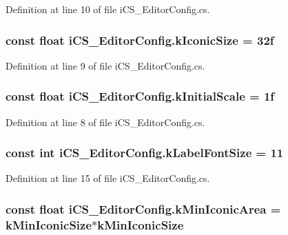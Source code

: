 Definition at line 10 of file i\+C\+S\+\_\+\+Editor\+Config.\+cs.

\hypertarget{classi_c_s___editor_config_a325fb27e60c2efe07d04c4103510268c}{
\subsubsection[{k\+Iconic\+Size}]{\setlength{\rightskip}{0pt plus 5cm}const float i\+C\+S\+\_\+\+Editor\+Config.\+k\+Iconic\+Size = 32f}}\label{classi_c_s___editor_config_a325fb27e60c2efe07d04c4103510268c}


Definition at line 9 of file i\+C\+S\+\_\+\+Editor\+Config.\+cs.

\hypertarget{classi_c_s___editor_config_a8ece9fb4625d0cacfbdb63d5f02f952b}{
\subsubsection[{k\+Initial\+Scale}]{\setlength{\rightskip}{0pt plus 5cm}const float i\+C\+S\+\_\+\+Editor\+Config.\+k\+Initial\+Scale = 1f}}\label{classi_c_s___editor_config_a8ece9fb4625d0cacfbdb63d5f02f952b}


Definition at line 8 of file i\+C\+S\+\_\+\+Editor\+Config.\+cs.

\hypertarget{classi_c_s___editor_config_a39c9fda912e4503a32baa835059e59ac}{
\subsubsection[{k\+Label\+Font\+Size}]{\setlength{\rightskip}{0pt plus 5cm}const int i\+C\+S\+\_\+\+Editor\+Config.\+k\+Label\+Font\+Size = 11}}\label{classi_c_s___editor_config_a39c9fda912e4503a32baa835059e59ac}


Definition at line 15 of file i\+C\+S\+\_\+\+Editor\+Config.\+cs.

\hypertarget{classi_c_s___editor_config_a5f508c4375e2836ce8aba4dd590599f6}{
\subsubsection[{k\+Min\+Iconic\+Area}]{\setlength{\rightskip}{0pt plus 5cm}const float i\+C\+S\+\_\+\+Editor\+Config.\+k\+Min\+Iconic\+Area = {\bf k\+Min\+Iconic\+Size}$\ast${\bf k\+Min\+Iconic\+Size}}}\label{classi_c_s___editor_config_a5f508c4375e2836ce8aba4dd590599f6}


